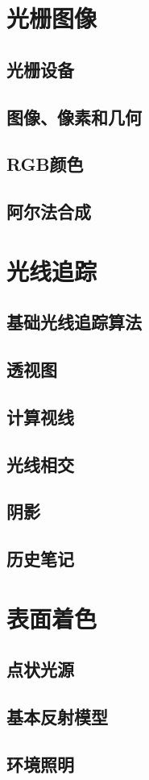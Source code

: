 \documentclass[lang=cn,10pt]{elegantbook}
\begin{document}
\chapter{光栅图像}

\section{光栅设备}

\section{图像、像素和几何}

\section{RGB颜色}

\section{阿尔法合成}

\chapter{光线追踪}

\section{基础光线追踪算法}

\section{透视图}

\section{计算视线}

\section{光线相交}

\section{阴影}

\section{历史笔记}

\chapter{表面着色}

\section{点状光源}


\section{基本反射模型}


\section{环境照明}
\end{document}
